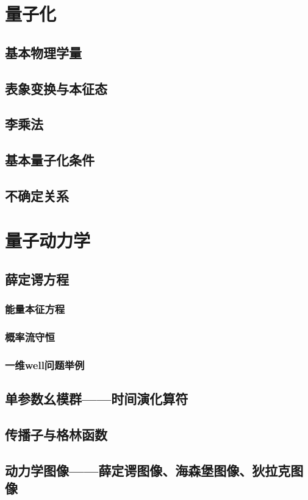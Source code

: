 \documentclass[a4paper,11pt]{article}
\begin{document}
\section{量子化}
\subsection{基本物理学量}
\subsection{表象变换与本征态}
\subsection{李乘法}
\subsection{基本量子化条件}
\subsection{不确定关系}
\section{量子动力学}
\subsection{薛定谔方程}
\subsubsection{能量本征方程}
\subsubsection{概率流守恒}
\subsubsection{一维well问题举例}
\subsection{单参数幺模群——时间演化算符}
\subsection{传播子与格林函数}
\subsection{动力学图像——薛定谔图像、海森堡图像、狄拉克图像}
\end{document}
